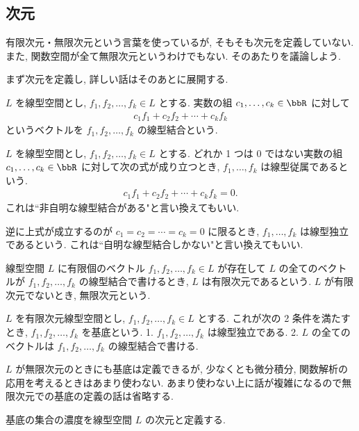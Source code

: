 \documentclass[openany, a4paper, oneside]{jsbook}
\begin{document}
\subsection{次元}

有限次元・無限次元という言葉を使っているが, そもそも次元を定義していない.
また, 関数空間が全て無限次元というわけでもない.
そのあたりを議論しよう.

まず次元を定義し, 詳しい話はそのあとに展開する.
\begin{defn}[線型結合]
$L$ を線型空間とし,
$f_1, f_2, \dots, f_k \in L$ とする.
実数の組 $c_1, \dots, c_k \in \bbR$ に対して
\begin{align}
 c_1 f_1 + c_2 f_2 + \cdots + c_k f_k
\end{align}
というベクトルを $f_1, f_2, \dots, f_k$ の線型結合という.
\end{defn}
\begin{defn}
$L$ を線型空間とし,
$f_1, f_2, \dots, f_k \in L$ とする.
どれか 1 つは 0 ではない実数の組 $c_1, \dots, c_k \in \bbR$ に対して次の式が成り立つとき,
$f_1, \dots, f_k$ は線型従属であるという.
\begin{align}
 c_1 f_1 + c_2 f_2 + \cdots + c_k f_k = 0.
\end{align}
これは``非自明な線型結合がある"と言い換えてもいい.

逆に上式が成立するのが $c_1 = c_2 = \cdots = c_k = 0$ に限るとき,
$f_1, \dots, f_k$ は線型独立であるという.
これは``自明な線型結合しかない"と言い換えてもいい.
\end{defn}
\begin{defn}
線型空間 $L$ に有限個のベクトル $f_1, f_2, \dots, f_k \in L$ が存在して
$L$ の全てのベクトルが $f_1, f_2, \dots, f_k$ の線型結合で書けるとき,
$L$ は有限次元であるという.
$L$ が有限次元でないとき, 無限次元という.
\end{defn}
\begin{defn}[基底]
$L$ を有限次元線型空間とし, $f_1, f_2, \dots, f_k \in L$ とする.
これが次の 2 条件を満たすとき, $f_1, f_2, \dots, f_k$ を基底という.
1. $f_1, f_2, \dots, f_k$ は線型独立である.
2. $L$ の全てのベクトルは $f_1, f_2, \dots, f_k$ の線型結合で書ける.
\end{defn}
\begin{rem}
$L$ が無限次元のときにも基底は定義できるが,
少なくとも微分積分, 関数解析の応用を考えるときはあまり使わない.
あまり使わない上に話が複雑になるので無限次元での基底の定義の話は省略する.
\end{rem}
\begin{defn}[次元]
基底の集合の濃度を線型空間 $L$ の次元と定義する.
\end{defn}
\end{document}

